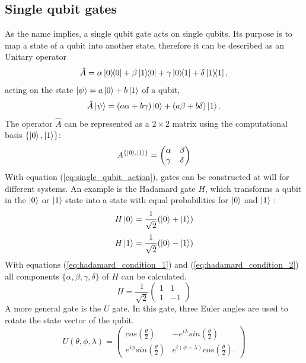 	\subsection{Single qubit gates}
		As the name implies, a single qubit gate acts on single qubits. Its purpose is to map a state of a qubit into another state,
		therefore it can be described as an Unitary operator
		\begin{equation}
			\label{eq:single_qubit_gate}
			\hat{A}=\alpha\ketbra{0}{0}+\beta\ketbra{1}{0}+\gamma\ketbra{0}{1}+\delta\ketbra{1}{1},
		\end{equation}
		acting on the state $\ket{\psi}=a\ket{0}+b\ket{1}$ of a qubit,
		\begin{equation}
			\label{eq:single_qubit_action}
			\hat{A}\ket{\psi}=(a\alpha+b\gamma)\ket{0} + (a\beta+b\delta)\ket{1}.
		\end{equation}
		The operator $\hat{A}$ can be represented as a $2\times 2$ matrix using the computational basis $\{\ket{0},\ket{1}\}$:
		\begin{equation}
			\label{eq:single_qubit_gate_matrix}
			A^{\{\ket{0},\ket{1}\}}=
			\begin{pmatrix}
				\alpha & \beta  \\
				\gamma & \delta
			\end{pmatrix}
		\end{equation}
		With equation (\ref{eq:single_qubit_action}), gates can be constructed at will for different systems.
		An example is the Hadamard gate $H$, which transforms a qubit in the $\ket{0}$ or $\ket{1}$ state into a state with equal probabilities for $\ket{0}$ and $\ket{1}$ \cite{Rieffel2011-ak}:
		\begin{equation}
			\label{eq:hadamard_condition_1}
			H\ket{0}=\frac{1}{\sqrt{2}}(\ket{0}+\ket{1})
		\end{equation}
		\begin{equation}
			\label{eq:hadamard_condition_2}
			H\ket{1}=\frac{1}{\sqrt{2}}(\ket{0}-\ket{1})
		\end{equation}
		With equations (\ref{eq:hadamard_condition_1}) and (\ref{eq:hadamard_condition_2}) all components $\{\alpha,\beta,\gamma,\delta\}$ of $H$ can be calculated.
		\begin{equation}
			\label{eq:hadamard_matrix}
			H=\frac{1}{\sqrt{2}}
			\begin{pmatrix}
				1 & 1  \\
				1 & -1
			\end{pmatrix}
		\end{equation}
		A more general gate is the $U$ gate. In this gate, three Euler angles \cite{Morin2008-za} are used to rotate the state vector of the qubit.
		\begin{equation}
			\label{eq:u_gate}
			U(\theta,\phi,\lambda) =
			\begin{pmatrix}
				cos\left(\frac{\theta}{2}\right) & -e^{i\lambda}sin\left(\frac{\theta}{2}\right)  \\
				e^{i\phi}sin\left(\frac{\theta}{2}\right) & e^{i(\phi+\lambda)}cos\left(\frac{\theta}{2}\right).
			\end{pmatrix}
		\end{equation}
